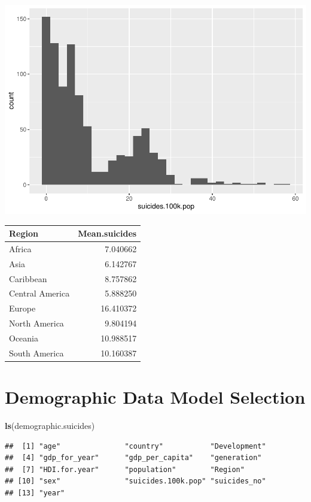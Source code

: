 \documentclass[11pt,]{article}
\newenvironment{Shaded}{\begin{snugshade}}{\end{snugshade}}
\newcommand{\KeywordTok}[1]{\textcolor[rgb]{0.13,0.29,0.53}{\textbf{#1}}}
\newcommand{\NormalTok}[1]{#1}
\begin{document}
\includegraphics{An-Analysis-of-Suicide-Data_files/figure-latex/unnamed-chunk-1-12.pdf}

\begin{longtable}[]{@{}lr@{}}
\toprule
Region & Mean.suicides\tabularnewline
\midrule
\endhead
Africa & 7.040662\tabularnewline
Asia & 6.142767\tabularnewline
Caribbean & 8.757862\tabularnewline
Central America & 5.888250\tabularnewline
Europe & 16.410372\tabularnewline
North America & 9.804194\tabularnewline
Oceania & 10.988517\tabularnewline
South America & 10.160387\tabularnewline
\bottomrule
\end{longtable}

\hypertarget{demographic-data-model-selection}{%
\section{Demographic Data Model
Selection}\label{demographic-data-model-selection}}

\begin{Shaded}
\begin{Highlighting}[]
\KeywordTok{ls}\NormalTok{(demographic.suicides)}
\end{Highlighting}
\end{Shaded}

\begin{verbatim}
##  [1] "age"               "country"           "Development"      
##  [4] "gdp_for_year"      "gdp_per_capita"    "generation"       
##  [7] "HDI.for.year"      "population"        "Region"           
## [10] "sex"               "suicides.100k.pop" "suicides_no"      
## [13] "year"
\end{verbatim}
\end{document}
